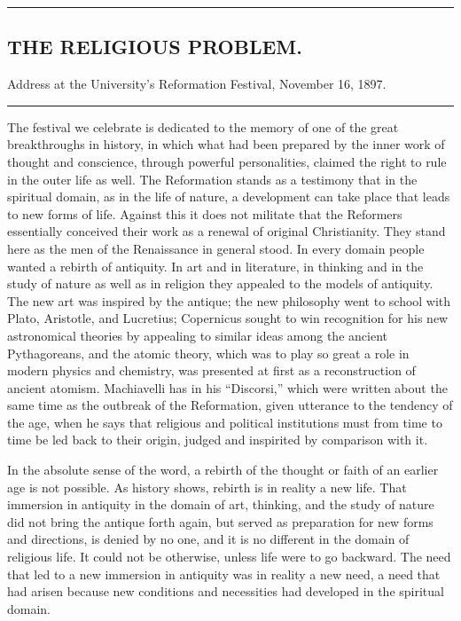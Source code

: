 \documentclass[12pt,a4paper,openany]{book}
\newcommand{\opage}[1]{\marginnote{\footnotesize\textit{[#1]}}}
\newcommand{\essay}[2][]{\chapter*{#2}\addcontentsline{toc}{chapter}{#1}}
\newcommand{\streg}{\begin{center}\rule{3em}{0.4pt}\end{center}}
\begin{document}
\streg{}

\opage{216}
\begin{center}

\essay[The Religious Problem]{THE RELIGIOUS PROBLEM.}

Address at the University's Reformation Festival, November 16, 1897.\end{center}

\streg{}

The festival we celebrate is dedicated to the memory of one of the great
breakthroughs in history, in which what had been prepared by the
inner work of thought and conscience, through powerful
personalities, claimed the right to rule in the outer life as well.
The Reformation stands as a testimony that in the
spiritual domain, as in the life of nature, a
development can take place that leads to new forms of life. Against this
it does not militate that the Reformers essentially conceived their work
as a renewal of original Christianity. They stand
here as the men of the Renaissance in general stood. In every domain
people wanted a rebirth of antiquity. In art and in
literature, in thinking and in the study of nature as well as in
religion they appealed to the models of antiquity. The
new art was inspired by the antique; the new philosophy went to
school with Plato, Aristotle, and Lucretius; Copernicus sought
to win recognition for his new astronomical theories
by appealing to similar ideas among the ancient
Pythagoreans, and the atomic theory, which was to play so great a
role in modern physics and chemistry, was presented at first as
a reconstruction of ancient atomism. Machiavelli has in
his ``Discorsi,'' which were written about the same time as the
outbreak of the Reformation, given utterance to the tendency of the age, when he says
that religious and political institutions must from time to time
be led back to their origin, judged and inspirited by
comparison with it.

\opage{217}In the absolute sense of the word, a rebirth of the thought or faith
of an earlier age is not possible. As history shows, rebirth
is in reality a new life. That immersion in
antiquity in the domain of art, thinking, and the study of nature
did not bring the antique forth again, but served as
preparation for new forms and directions, is denied by
no one, and it is no different in the domain of
religious life. It could not be otherwise,
unless life were to go backward. The need that led
to a new immersion in antiquity was in reality a new
need, a need that had arisen because new conditions
and necessities had developed in the spiritual
domain.
\end{document}
